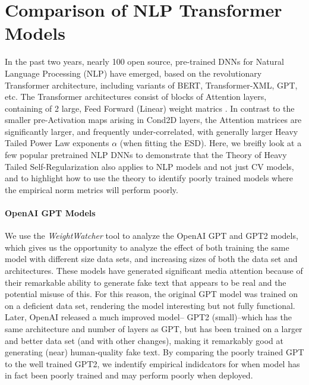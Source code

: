 \section{Comparison of NLP Transformer Models}
\label{sxn:nlp}



In the past two years, nearly 100 open source, pre-trained DNNs for Natural Language Processing (NLP) have emerged,
based on the revolutionary Transformer architecture, including variants of BERT, Transformer-XML, GPT, etc.
The Transformer architectures consist of blocks of Attention layers, containing of 2 large, Feed Forward (Linear)
weight matrics \cite{Attn2017}. In contrast to the smaller pre-Activation maps arising in Cond2D layers,
the Attention matrices are significantly larger, and frequently under-correlated, with generally larger
Heavy Tailed Power Law exponents $\alpha$ (when fitting the ESD).  Here, we breifly look at a few
popular pretrained NLP DNNs to demonstrate that the Theory of Heavy Tailed Self-Regularization also
applies to NLP models and not just CV models, and to highlight how to use the theory to identify
poorly trained models where the empirical norm metrics will perform poorly.

\paragraph{OpenAI GPT Models}
We use the \emph{WeightWatcher} tool to analyze the OpenAI GPT and GPT2 models, which gives us
the opportunity to analyze the effect of both training the same model with different size data sets,
and increasing sizes of both the data set and architectures.
These models have generated significant media attention because of their remarkable ability to
 generate fake text that appears to be real and the potential misuse of this.
For this reason, the original GPT model was trained on on a deficient data set, rendering
the model interesting but not fully functional.  Later, OpenAI released a much improved model--
GPT2 (small)--which has the same architecture and number of layers as GPT, but has
been trained on a larger and better data set (and with other changes), making it
remarkably good at generating (near) human-quality fake text.  
By comparing the poorly trained GPT to the well trained GPT2, we
indentify empirical indidcators for when  model has in fact
been poorly trained and may perform poorly when deployed.

